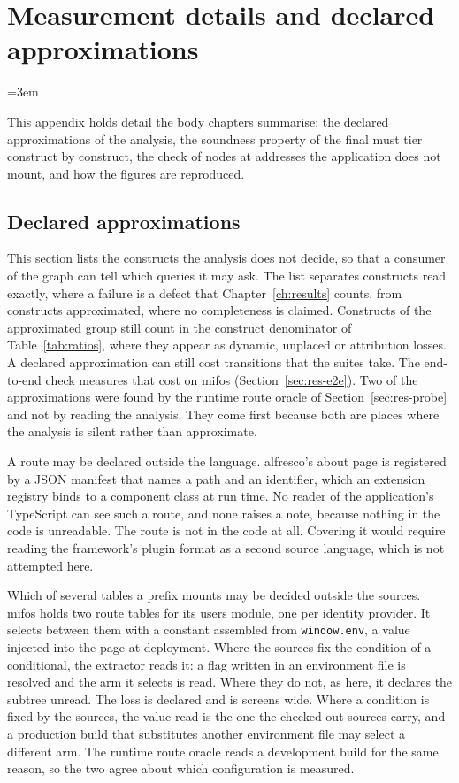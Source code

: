 \chapter{Measurement details and declared approximations}
\label{app:details}
\emergencystretch=3em

This appendix holds detail the body chapters summarise: the declared approximations of the analysis,
the soundness property of the final must tier construct by construct, the check of nodes at
addresses the application does not mount, and how the figures are reproduced.

\section{Declared approximations}
\label{sec:approximations}

This section lists the constructs the analysis does not decide, so that a consumer of the graph
can tell which queries it may ask.
The list separates constructs read exactly, where a failure is a defect that Chapter~\ref{ch:results}
counts, from constructs approximated, where no completeness is claimed. Constructs of the approximated group still count in the construct denominator of Table~\ref{tab:ratios}, where they appear as dynamic, unplaced or attribution losses. A declared approximation can still cost transitions that the suites take.
The end-to-end check measures that cost on mifos (Section~\ref{sec:res-e2e}).
Two of the approximations were found by the runtime route oracle of Section~\ref{sec:res-probe} and not by
reading the analysis.
They come first because both are places where the analysis is silent rather than approximate.

A route may be declared outside the language.
alfresco's about page is registered by a JSON manifest that names a path and an identifier, which
an extension registry binds to a component class at run time.
No reader of the application's TypeScript can see such a route, and none raises a note, because
nothing in the code is unreadable.
The route is not in the code at all.
Covering it would require reading the framework's plugin format as a second source language,
which is not attempted here.

Which of several tables a prefix mounts may be decided outside the sources.
mifos holds two route tables for its users module, one per identity provider.
It selects between them with a constant assembled from \texttt{window.env}, a value injected into the
page at deployment.
Where the sources fix the condition of a conditional, the extractor reads it: a flag written in an
environment file is resolved and the arm it selects is read.
Where they do not, as here, it declares the subtree unread.
The loss is declared and is \ProbeMissedMifos{} screens wide.
Where a condition is fixed by the sources, the value read is the one the checked-out sources carry,
and a production build that substitutes another environment file may select a different arm.
The runtime route oracle reads a development build for the same reason, so the two agree about which
configuration is measured.


